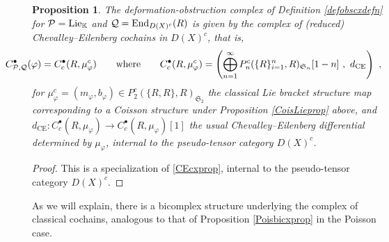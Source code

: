 \documentclass[11pt]{amsart}
\numberwithin{equation}{section}
\newtheorem{prop}[theo]{Proposition}
\theoremstyle{definition}
\newcommand{\bb}{\mathbb}
\newcommand{\mc}{\mathcal}
\newcommand{\mf}{\mathfrak}
\newcommand{\K}{{\bb K}}
\newcommand{\End}{{\textup{End}}}
\newcommand{\Lie}{{\textup{Lie}}}
\newcommand{\Ss}{{{\mf{S}}}}
\newcommand{\0}{{\textbf{0}}}
\newcommand{\DD}{{D}}
\def \mf{\mathfrak}
\begin{document}
\begin{prop}\label{chPoiscxprop}
	The deformation-obstruction complex of Definition \ref{defobscxdefn} for $\mc P=\Lie_\K$ and $\mc Q=\End_{\DD(X)^c}(R)$ is given by the complex of (reduced) Chevalley--Eilenberg cochains in $\DD(X)^c$, that is,
	\[ \hspace*{-1cm} C^\bullet_{\mc P,\mc Q}(\varphi) = C^\bullet_{c}(R,\mu_\varphi^c) \qquad \text{where}\qquad C^\bullet_{c}(R,\mu_\varphi^c) = \left( \bigoplus_{n=1}^\infty   P_n^c(\{ R\}_{i=1}^n,R)_{\Ss_n}[1-n] \ , \ d_\text{CE} \right)  \ , \]
	for $\mu_\varphi^c=(m_\varphi,b_\varphi)\in P_2^c(\{R,R\},R)_{\Ss_2}$ the classical Lie bracket structure map corresponding to a Coisson structure under Proposition \ref{CoisLieprop} above, and $d_\text{CE}:C^\bullet_{c}(R,\mu_\varphi)\to C^\bullet_{c}(R,\mu_\varphi)[1]$ the usual Chevalley--Eilenberg differential determined by $\mu_\varphi$, internal to the pseudo-tensor category $\DD(X)^c$.
\end{prop}
\begin{proof} 
This is a specialization of \ref{CEcxprop}, internal to the pseudo-tensor category $\DD(X)^c$.
\end{proof}


As we will explain, there is a bicomplex structure underlying the complex of classical cochains, analogous to that of Proposition \ref{Poisbicxprop} in the Poisson case. 

%
%
\end{document}

